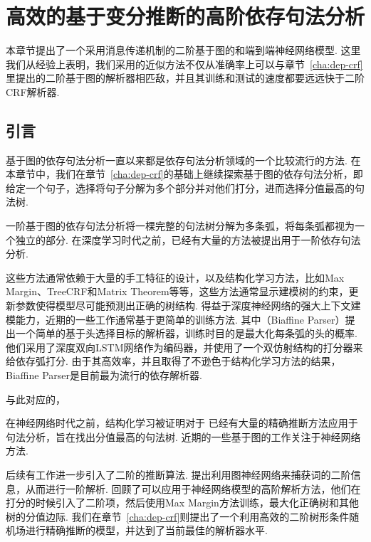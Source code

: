 \chapter{高效的基于变分推断的高阶依存句法分析}\label{cha:approximate-vi}

本章节提出了一个采用消息传递机制的二阶基于图的和端到端神经网络模型.
这里我们从经验上表明，我们采用的近似方法不仅从准确率上可以与章节~\ref{cha:dep-crf}里提出的二阶基于图的解析器相匹敌，并且其训练和测试的速度都要远远快于二阶CRF解析器.

\section{引言}\label{sec:dep-vi-intro}
基于图的依存句法分析一直以来都是依存句法分析领域的一个比较流行的方法.
在本章节中，我们在章节~\ref{cha:dep-crf}的基础上继续探索基于图的依存句法分析，即给定一个句子，选择将句子分解为多个部分并对他们打分，进而选择分值最高的句法树.

一阶基于图的依存句法分析将一棵完整的句法树分解为多条弧，将每条弧都视为一个独立的部分.
在深度学习时代之前，已经有大量的方法被提出用于一阶依存句法分析\cite{mcdonald-pereira-2006-online,koo-etal-2007-structured,ma-hovy-2017-neural,dozat-etal-2017-biaffine}.

这些方法通常依赖于大量的手工特征的设计，以及结构化学习方法，比如Max Margin、TreeCRF和Matrix Theorem等等，这些方法通常显示建模树的约束，更新参数使得模型尽可能预测出正确的树结构.
得益于深度神经网络的强大上下文建模能力，近期的一些工作通常基于更简单的训练方法.
其中\cite{dozat-etal-2017-biaffine}（Biaffine Parser）提出一个简单的基于头选择目标的解析器，训练时目的是最大化每条弧的头的概率.
他们采用了深度双向LSTM网络作为编码器，并使用了一个双仿射结构的打分器来给依存弧打分.
由于其高效率，并且取得了不逊色于结构化学习方法的结果\cite{zhang-etal-2019-empirical,falenska-kuhn-2019-non}，Biaffine Parser是目前最为流行的依存解析器.

与此对应的，

在神经网络时代之前，结构化学习被证明对于
已经有大量的精确推断方法\cite{mcdonald-pereira-2006-online,carreras-2007-experiments,koo-collins-2010-efficient,ma-zhao-2012-fourth}应用于句法分析，旨在找出分值最高的句法树.
近期的一些基于图的工作关注于神经网络方法\cite{chen-manning-2014-fast,kiperwasser-goldberg-2016-simple,dozat-etal-2017-biaffine,ma-hovy-2017-neural}.

后续有工作进一步引入了二阶的推断算法.
\cite{ji-etal-2019-graph}提出利用图神经网络来捕获词的二阶信息，从而进行一阶解析.
\cite{fonseca-martins-2020-revisiting}回顾了可以应用于神经网络模型的高阶解析方法，他们在打分的时候引入了二阶项，然后使用Max Margin方法训练，最大化正确树和其他树的分值边际.
我们在章节~\ref{cha:dep-crf}则提出了一个利用高效的二阶树形条件随机场进行精确推断的模型，并达到了当前最佳的解析器水平.

